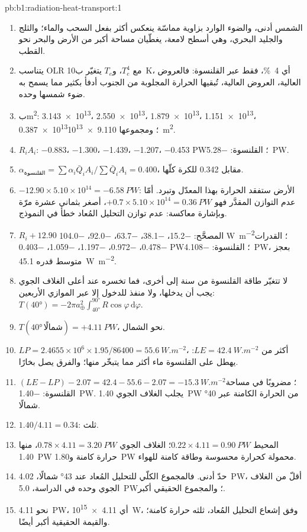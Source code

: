 \begin{solution}{pb:b1:radiation-heat-transport:1}
\begin{enumerate}
  \item الشمس أدنى، والضوء الوارد بزاوية مماسّة ينعكس أكثر بفعل السحب والماء؛ والثلج والجليد البحري، وهي أسطح لامعة، يغطّيان مساحة أكبر من الأرض والبحر نحو القطب.
  \item يتناسب OLR مع $T_e^4$، و$T_e$ يتغيّر ب\qty{10}{K}، أي \qty{4}{\percent}، فقط عبر القلنسوة: فالعروض العالية، العروض العالية، تُبقيها الحرارة المجلوبة من الجنوب أدفأ بكثير مما يسمح به ضوء شمسها وحده.
  \item ب\unit{m^2}: \num{3.143e13}، \num{2.550e13}، \num{1.879e13}،
        \num{1.151e13}، \num{0.387e13}؛ ومجموعها \qty{9.110e13}{m^2}.
  \item $R_iA_i$: \num{-0.883}، \num{-1.300}، \num{-1.439}، \num{-1.207}،
        \num{-0.453} \unit{PW}؛ القلنسوة: \qty{-5.28}{PW}.
  \item $\alpha_\text{القلنسوة} = \sum\alpha_i\bar Q_iA_i/\sum\bar Q_iA_i = 0.400$،
        مقابل \num{0.342} للكرة كلّها.
  \item $-12.90 \times 5.10\times10^{14} = \qty{-6.58}{PW}$: الأرض ستفقد الحرارة بهذا المعدّل وتبرد. أمّا عدم التوازن المقدَّر فهو
        $+0.7 \times 5.10\times10^{14} = \qty{+0.36}{PW}$، أصغر بثماني عشرة مرّة
        وبإشارة معاكسة: عدم توازن التحليل المُعاد خطأ في النموذج.
  \item $R_i + 12.90$ المصحَّح: \num{-15.2}، \num{-38.1}، \num{-63.7}،
        \num{-92.0}، \num{-104.0} \unit{W.m^{-2}}؛ القدرات \num{-0.478}،
        \num{-0.972}، \num{-1.197}، \num{-1.059}، \num{-0.403} \unit{PW}؛ القلنسوة:
        \qty{-4.108}{PW}، بعجز متوسط قدره \qty{45.1}{W.m^{-2}}.
  \item لا تتغيّر طاقة القلنسوة من سنة إلى أخرى، فما تخسره عند أعلى الغلاف الجوي يجب أن يدخلها، ولا منفذ للدخول إلا عبر الموازي الأربعين: $T(\ang{40}) = -2\pi a_\oplus^2\int_{\ang{40}}^{\ang{90}}
        R\cos\varphi\,\mathrm d\varphi$.
  \item $T(\ang{40}\,\text{شمالًا}) = +\qty{4.11}{PW}$، نحو الشمال.
  \item $LP = 2.4655\times10^6 \times 1.95/86400 = \qty{55.6}{W.m^{-2}}$، أكثر من
        $LE = \qty{42.4}{W.m^{-2}}$: يهطل على القلنسوة ماء أكثر مما يتبخّر منها؛ والفرق يصل بخارًا.
  \item $(LE - LP) - 2.07 = 42.4 - 55.6 - 2.07 = \qty{-15.3}{W.m^{-2}}$؛ مضروبًا في
        مساحة القلنسوة: \qty{-1.40}{PW}. يجلب الغلاف الجوي \qty{1.40}{PW}
        من الحرارة الكامنة عبر \ang{40} شمالًا.
  \item $1.40/4.11 = 0.34$: ثلث.
  \item المحيط $0.22 \times 4.11 = \qty{0.90}{PW}$؛ الغلاف الجوي $0.78 \times 4.11 =
        \qty{3.20}{PW}$، منها \qty{1.40}{PW} حرارة كامنة و\qty{1.80}{PW}
        محمولة كحرارة محسوسة وطاقة كامنة للهواء.
  \item حدّ أدنى. فالمجموع الكلّي للتحليل المُعاد عند \ang{43} شمالًا، \qty{4.02}{PW}، أقلّ من الغلاف الجوي وحده في الدراسة، \qty{5.0}{PW}؛ والمجموع الحقيقي أكبر.
  \item نحو \qty{4.11}{PW}، أي \qty{4.11e15}{W}، وفق إشعاع التحليل المُعاد، ثلثه حرارة كامنة؛ والقيمة الحقيقية أكبر أيضًا.
\end{enumerate}
\end{solution}
